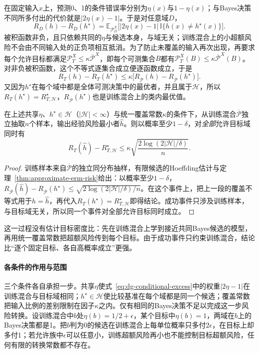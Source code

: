 在固定输入$x$上，预测0、1的条件错误率分别为$\eta(x)$与$1-\eta(x)$；与Bayes决策不同所多付出的代价就是$|2\eta(x)-1|$。于是对任意域$D$，
\begin{equation}
 R_D(h)-R_D(h^\star)
 =\mathbb E_{\mathcal P_D^X}
   \bigl[|2\eta(x)-1|\,\mathbb I\{h(x)\neq h^\star(x)\}\bigr].
 \label{eq:dg-conditional-excess}
\end{equation}
被积函数非负，且只依赖共同的$\eta$与候选本身，与域无关；训练混合上的小超额风险不会由不同输入处的正负项相互抵消。为了防止未覆盖的输入再次出现，再要求每个允许目标都满足$\mathcal P_T^X\leq\kappa\overline{\mathcal P}^X$，即每个可测集合$B$都有$\mathcal P_T^X(B)\leq\kappa\overline{\mathcal P}^X(B)$。对非负被积函数，这个不等式逐集合成立便逐函数成立，于是
\[
 R_T(h)-R_T(h^\star)\leq\kappa\bigl[R_{\overline{\mathcal P}}(h)-R_{\overline{\mathcal P}}(h^\star)\bigr].
\]
又因为$h^\star$在每个域中都是全体可测决策中的最优者，并且属于$\mathcal H$，所以$R_T(h^\star)=R_{T,\mathcal H}^{\star}$，$R_{\overline{\mathcal P}}(h^\star)$也是训练混合上的类内最优值。

\begin{theorem}[共同Bayes候选下的逐目标域保证]
\label{thm:dg-target-wise}
在上述共享$\eta$、$h^\star\in\mathcal H$（$|\mathcal H|<\infty$）与统一覆盖常数$\kappa$的条件下，从训练混合$\overline{\mathcal P}$独立抽取$n$个样本，输出经验风险最小者$\widehat h$。则以概率至少$1-\delta$，对\emph{全部}允许目标域同时有
\[
 R_T(\widehat h)-R_{T,\mathcal H}^{\star}
 \leq\kappa\sqrt{\frac{2\log(2|\mathcal H|/\delta)}{n}} .
\]
\end{theorem}
\begin{proof}
训练样本来自$\overline{\mathcal P}$的独立同分布抽样，有限候选的Hoeffding估计与定理~\ref{thm:approximate-erm-risk}给出：以概率至少$1-\delta$，$R_{\overline{\mathcal P}}(\widehat h)-R_{\overline{\mathcal P}}(h^\star)\leq\sqrt{2\log(2|\mathcal H|/\delta)/n}$。在这个事件上，把上一段的覆盖不等式用于$h=\widehat h$，再代入$R_T(h^\star)=R_{T,\mathcal H}^{\star}$即得结论。成功事件只涉及训练样本，与目标域无关，所以同一个事件对全部允许目标同时成立。
\end{proof}

这一过程没有估计目标密度比：先在训练混合上学到接近共同Bayes候选的模型，再用统一覆盖常数把超额风险传到每个目标。由于成功事件只约束训练混合，结论比“逐个固定目标、各自高概率成立”更强。
\paragraph{各条件的作用与范围}
三个条件各自承担一步。共享$\eta$使式~\eqref{eq:dg-conditional-excess}中的权重$|2\eta-1|$在训练混合与目标域相同；$h^\star\in\mathcal H$使比较基准在每个域都是同一个候选；覆盖常数把输入比例的差别限制在因子$\kappa$之内。仅有相同的Bayes决策不足以完成这一步风险转换。设训练混合中$b$处$\eta(b)=1/2+\epsilon$，某个目标中$\eta(b)=1$，两域在$b$上的Bayes决策都是1。把$b$判为0的候选在训练混合上每单位概率只多付$2\epsilon$，在目标上却多付1；若允许族中$\epsilon$可以任意小，训练超额风险再小也不能控制目标超额风险，任何有限的转换常数都不存在。

